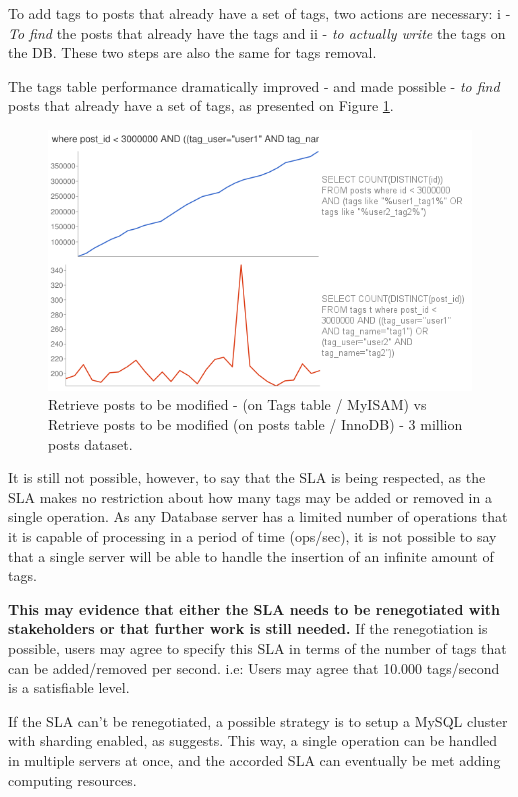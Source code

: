 To add tags to posts that already have a set of tags, two actions are necessary: i - \textit{To find} the posts that already have the tags and ii - \textit{to actually write} the tags on the DB. These two steps are also the same for tags removal.

The tags table performance dramatically improved - and made possible - \textit{ to find} posts that already have a set of tags, as presented on Figure \ref{fig:tagsVSposts}.

\begin{figure}[ht!]
\centering
\includegraphics[width=120mm]{Imagens/tagsVSposts.png}
\caption{Retrieve posts to be modified -  (on Tags table / MyISAM) vs Retrieve posts to be modified (on posts table / InnoDB) - 3 million posts dataset.\label{fig:tagsVSposts}}
\end{figure}

It is still not possible, however, to say that the SLA is being respected, as the SLA makes no restriction about how many tags may be added or removed in a single operation. As any Database server has a limited number of operations that it is capable of processing in a period of time (ops/sec), it is not possible to say that a single server will be able to handle the insertion of an infinite amount of tags. 

\textbf{This may evidence that either the SLA needs to be renegotiated with stakeholders or that further work is still needed.} If the renegotiation is possible, users may agree to specify this SLA in terms of the number of tags that can be added/removed per second. i.e: Users may agree that 10.000 tags/second is a satisfiable level. 

If the SLA can't be renegotiated, a possible strategy is to setup a MySQL cluster with sharding enabled, as \cite{mysqlsharding} suggests. This way, a single operation can be handled in multiple servers at once, and the accorded SLA can eventually be met adding computing resources.


